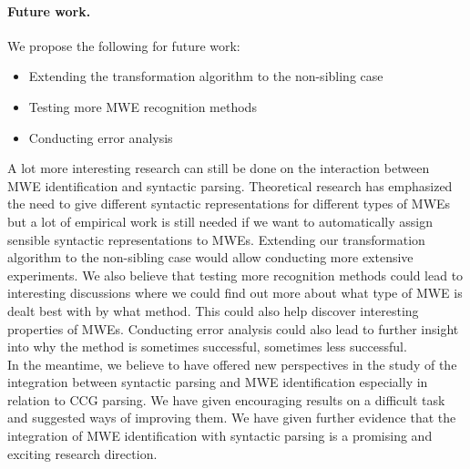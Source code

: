 \documentclass[output=paper]{LSP/langsci}
\begin{document}
\paragraph*{Future work.}
We propose the following for future work:
\begin{itemize}
    \setlength\itemsep{0pt}
    \item Extending the transformation algorithm to the non-sibling case
    \item Testing more MWE recognition methods
    \item Conducting error analysis
\end{itemize}
\indent A lot more interesting research can still be done on the interaction between MWE identification and syntactic parsing. Theoretical research has emphasized the need to give different syntactic representations for different types of MWEs but a lot of empirical work is still needed if we want to automatically assign sensible syntactic representations to MWEs. Extending our transformation algorithm to the non-sibling case would allow conducting more extensive experiments. We also believe that testing more recognition methods could lead to interesting discussions where we could find out more about what type of MWE is dealt best with by what method. This could also help discover interesting properties of MWEs. Conducting error analysis could also lead to further insight into why the method is sometimes successful, sometimes less successful. \\
\indent In the meantime, we believe to have offered new perspectives in the study of the integration between syntactic parsing and MWE identification especially in relation to CCG parsing. We have given encouraging results on a difficult task and suggested ways of improving them. We have given further evidence that the integration of MWE identification with syntactic parsing is a promising and exciting research direction.
 
\printbibliography[heading=subbibliography,notkeyword=this]
\end{document}
